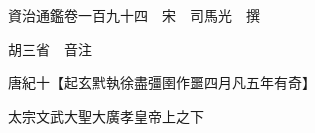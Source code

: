 










 


 
 


 

  
  
  
  
  





  
  
  
  
  
 
  

  

  
  
  



  

 
 

  
   




  

  
  


  　　資治通鑑卷一百九十四　宋　司馬光　撰

　　胡三省　音注

　　唐紀十【起玄黓執徐盡彊圉作噩四月凡五年有奇】

　　太宗文武大聖大廣孝皇帝上之下

